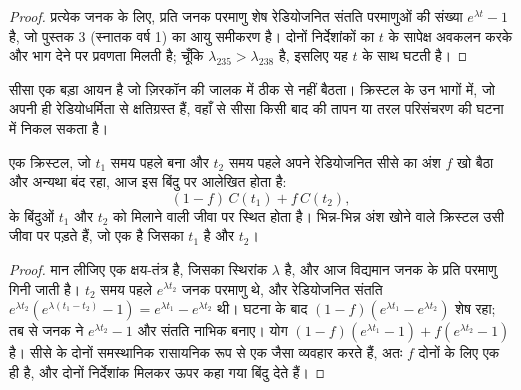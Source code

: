 \begin{proof}
प्रत्येक जनक के लिए, प्रति जनक परमाणु शेष रेडियोजनित संतति परमाणुओं की संख्या
$e^{\lambda t} - 1$ है, जो पुस्तक 3 (स्नातक वर्ष 1) का आयु समीकरण है।
दोनों निर्देशांकों का $t$ के सापेक्ष अवकलन करके और भाग देने पर प्रवणता मिलती है; चूँकि
$\lambda_{235} > \lambda_{238}$ है, इसलिए यह $t$ के साथ घटती है।
\end{proof}

सीसा एक बड़ा आयन है जो ज़िरकॉन की जालक में ठीक से नहीं बैठता। क्रिस्टल के उन भागों में,
जो अपनी ही रेडियोधर्मिता से क्षतिग्रस्त हैं, वहाँ से सीसा किसी बाद की
तापन या तरल परिसंचरण की घटना में निकल सकता है।

\begin{theorem}[सीसे की रुक-रुककर होने वाली हानि एक जीवा देती है]\label{thm:b3:advanced-geochronology:discordia}
एक क्रिस्टल, जो $t_1$ समय पहले बना और $t_2$ समय पहले
अपने रेडियोजनित सीसे का अंश $f$ खो बैठा और अन्यथा बंद रहा, आज इस बिंदु पर आलेखित होता है:
\[
(1 - f)\,C(t_1) + f\,C(t_2),
\]
 के बिंदुओं $t_1$ और $t_2$ को मिलाने वाली जीवा पर स्थित होता है। भिन्न-भिन्न अंश खोने वाले क्रिस्टल
उसी जीवा पर पड़ते हैं, जो एक  है जिसका  $t_1$ है और  $t_2$।
\end{theorem}

\begin{proof}
मान लीजिए एक क्षय-तंत्र है, जिसका स्थिरांक $\lambda$ है, और आज विद्यमान जनक के
प्रति परमाणु गिनी जाती है। $t_2$ समय पहले $e^{\lambda t_2}$ जनक परमाणु थे, और
रेडियोजनित संतति $e^{\lambda t_2}(e^{\lambda(t_1 - t_2)} - 1) =
e^{\lambda t_1} - e^{\lambda t_2}$ थी। घटना के बाद $(1 - f)(e^{\lambda t_1} -
e^{\lambda t_2})$ शेष रहा; तब से जनक ने $e^{\lambda t_2} - 1$ और संतति नाभिक बनाए।
योग $(1 - f)(e^{\lambda t_1} - 1) + f(e^{\lambda t_2} - 1)$ है। सीसे के दोनों
समस्थानिक रासायनिक रूप से एक जैसा व्यवहार करते हैं, अतः $f$ दोनों के लिए एक ही है, और दोनों
निर्देशांक मिलकर ऊपर कहा गया बिंदु देते हैं।
\end{proof}

